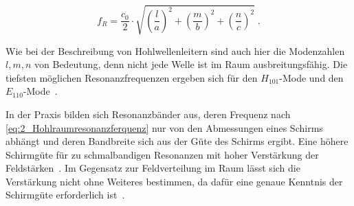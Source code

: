 \begin{equation}
    f_R = \frac{c_0}{2}\cdot \sqrt{\left(\frac{l}{a}\right)^2+\left(\frac{m}{b}\right)^2+\left(\frac{n}{c}\right)^2} \; \text{.}
    \label{eq:2_Hohlraumresonanzferquenz}
\end{equation}


Wie bei der Beschreibung von Hohlwellenleitern sind auch hier die Modenzahlen $l, m, n$ von Bedeutung, denn nicht jede Welle ist im Raum ausbreitungsfähig. Die tiefsten möglichen Resonanzfrequenzen ergeben sich für den $H_{101}$-Mode und den $E_{110}$-Mode~\cite{Klassische_Elektrodynamik}. 
\par
\vspace{\linespace}
In der Praxis bilden sich Resonanzbänder aus, deren Frequenz nach \Gleichung\eqref{eq:2_Hohlraumresonanzferquenz} nur von den Abmessungen eines Schirms abhängt und deren Bandbreite sich aus der Güte des Schirms ergibt. Eine höhere Schirmgüte für zu schmalbandigen Resonanzen mit hoher Verstärkung der Feldstärken~\cite{EM_Schirmung}. Im Gegensatz zur Feldverteilung im Raum lässt sich die Verstärkung nicht ohne Weiteres bestimmen, da dafür eine genaue Kenntnis der Schirmgüte erforderlich ist~\cite{EM_Schirmung}.


